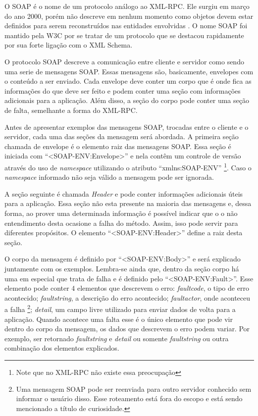 O SOAP                                 é o nome de um protocolo análogo ao XML-RPC.
Ele surgiu em março do ano 2000, porém não descreve em nenhum momento como objetos
devem estar definidos para serem reconstruídos nas entidades
envolvidas \cite{cerami2002web}. O nome SOAP foi mantido pela W3C por se tratar
de um protocolo que se destacou rapidamente por sua forte ligação com o XML Schema.

O protocolo SOAP descreve a comunicação entre cliente e servidor como sendo uma serie
de mensagens SOAP. Essas mensagens são, basicamente, envelopes com o conteúdo a ser
enviado. Cada envelope deve conter um corpo que é onde fica as informações do que
deve ser feito e podem conter uma seção com informações adicionais para a aplicação.
Além disso, a seção do corpo pode conter uma seção de falta, semelhante a
forma do XML-RPC.

Antes de apresentar exemplos das mensagens SOAP, trocadas entre o cliente e o
servidor, cada uma das seções da mensagem será abordada.
A primeira seção chamada de envelope
é o elemento raiz das mensagens SOAP. Essa seção é iniciada com
``<SOAP-ENV:Envelope>'' e nela contêm um controle de versão através do uso de
\emph{namespace} utilizando o atributo ``xmlns:SOAP-ENV'' \footnote{Note que no XML-RPC não existe essa preocupação}. Caso o
\emph{namespace} informado não seja válido a mensagem pode ser ignorada.

A seção seguinte é chamada \emph{Header} e pode conter informações adicionais úteis
para a aplicação. Essa seção não esta presente na maioria das mensagens e,
dessa forma,
ao prover uma determinada informação é possível indicar que o
o não entendimento desta ocasione a falha do método. Assim, isso pode
servir para diferentes propósitos. O elemento ``<SOAP-ENV:Header>''
define a raiz desta seção.

O corpo da mensagem é definido por ``<SOAP-ENV:Body>'' e
será explicado juntamente com os exemplos. Lembra-se ainda que,
dentro da seção corpo há uma em especial que trata
de falha e é definido pelo ``<SOAP-ENV:Fault>''. Esse elemento pode conter 4 elementos que
descrevem o erro: \emph{faultcode}, o tipo de erro acontecido; \emph{faultstring}, a
descrição do erro acontecido; \emph{faultactor}, onde aconteceu a falha \footnote{Uma mensagem SOAP pode ser reenviada para outro servidor conhecido sem informar o usuário disso. Esse roteamento está fora do escopo e está sendo mencionado a título de curiosidade.}; \emph{detail}, um campo livre
utilizado para enviar dados de volta para a aplicação. Quando acontece uma falta esse
é o único elemento que pode vir dentro do corpo da mensagem, os dados que descrevem o
erro podem variar. Por exemplo, ser retornado \emph{faultstring} e \emph{detail}
ou somente \emph{faultstring} ou outra combinação dos elementos explicados.


